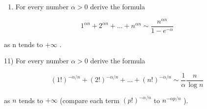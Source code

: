 \begin{enumerate}
\def\labelenumi{\arabic{enumi})}
\setcounter{enumi}{9}
\tightlist
\item
  For every number \(\alpha > 0\) derive the formula
\end{enumerate}

\[
1 ^ {\alpha n} + 2 ^ {\alpha n} + \dots + n ^ {\alpha n} \sim \frac {n ^ {\alpha n}}{1 - e ^ {- \alpha}}
\]

as n tends to \(+\infty\) .

11) For every number \(\alpha > 0\) derive the formula

\[
(1!) ^ {- \alpha / n} + (2!) ^ {- \alpha / n} + \dots + (n!) ^ {- \alpha / n} \sim \frac {1}{\alpha} \frac {n}{\log n}
\]

as \(n\) tends to \(+\infty\) (compare each term \((p!)^{-\alpha / n}\) to \(n^{-\alpha p / n}\) ).

